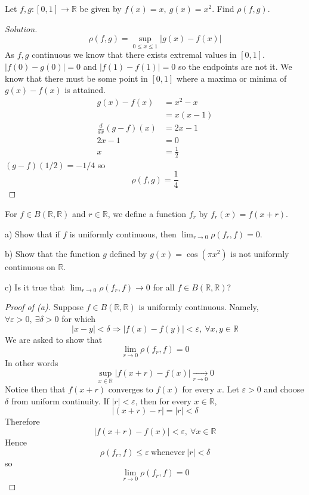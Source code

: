 \begin{prob}
    Let $f,g : [0,1] \to \mathbb R$ be given by 
    $f(x) = x, \: g(x) = x^2$. Find $\rho(f,g)$. 
\end{prob}
\begin{proof}[Solution]
    \[
        \rho(f,g) = \sup_{0\leq x \leq 1}|g(x) - f(x)|
    \]
    As $f,g$ continuous we know that there exists extremal values 
    in $[0,1]$. 
    $|f(0) - g(0)| = 0$ and $|f(1) - f(1)| = 0$ so 
    the endpoints are not it. We know that there must be some 
    point in $[0,1]$ where a maxima or minima of $g(x) - f(x)$ is 
    attained. 
    \begin{align*}
        g(x) - f(x) &= x^2 - x \\ 
                    &= x(x-1) \\ 
        \frac{d}{dx}(g-f)(x) &= 2x - 1\\  
        2x - 1 &= 0 \\ 
        x &= \frac{1}{2}
    \end{align*}
    $(g-f)(1/2) = - 1 / 4$ so 
    \[
        \rho(f,g) = \frac{1}{4}
    \]
\end{proof}
\begin{prob}
    For $f \in B(\mathbb R, \mathbb R)$ and $r \in \mathbb R$, 
    we define a function $f_r$ by $f_r(x) = f(x + r)$. 

    a) Show that if $f$ is uniformly continuous, then 
    $\lim_{r\to 0}\rho(f_r,f) = 0$. 

    b) Show that the function $g$ defined by $g(x) = \cos(\pi x^2)$ 
    is not uniformly continuous on $\mathbb R$. 

    c) Is it true that $\lim_{r\to0}\rho(f_r,f) \to 0$ for 
    all $f \in B(\mathbb R, \mathbb R)$?
\end{prob}
\begin{proof}[Proof of (a)]
    Suppose $f \in B(\mathbb R, \mathbb R)$ is uniformly continuous. 
    Namely, $\forall \varepsilon > 0, \: \exists \delta > 0$ for 
    which 
    \[
        |x-y| < \delta \Rightarrow |f(x) - f(y)| < \varepsilon, 
        \: \forall x,y \in \mathbb R
    \]
    We are asked to show that 
    \[
        \lim_{r\to 0}\rho(f_r, f) = 0
    \]
    In other words  
    \[
        \sup_{x \in \mathbb R}|f(x+r)-f(x)| 
        \underset{r \to 0}{\to} 0
    \]
    Notice then that $f(x+r)$ converges to $f(x)$ for every $x$.
    Let $\varepsilon > 0$ and choose $\delta$ from uniform 
    continuity. If $|r| < \varepsilon$, then for every 
    $x\in \mathbb R$, 
    \[
        |(x+r) - r| = |r| < \delta
    \]
    Therefore 
    \[
        |f(x+r) - f(x)| < \varepsilon, \: \forall x\in\mathbb R
    \]
    Hence 
    \[
        \rho(f_r,f) \leq \varepsilon \ \text{whenever} \ |r| < \delta
    \]
    so 
    \[
        \lim_{r\to 0}\rho(f_r,f) = 0
    \]
\end{proof}


